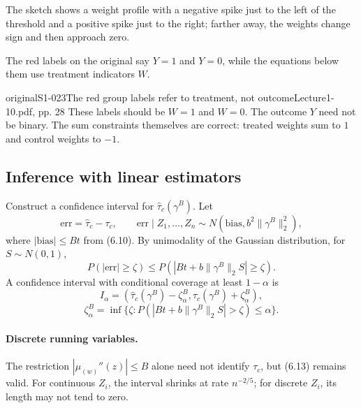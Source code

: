 The sketch shows a weight profile with a negative spike just to the left of the threshold and a positive spike just to the right; farther away, the weights change sign and then approach zero.
\begin{center}\end{center}
 The red labels on the original say $Y=1$ and $Y=0$, while the equations below them use treatment indicators $W$.
\begin{reviewnote}{original}{S1-023}{The red group labels refer to treatment, not outcome}{Lecture1-10.pdf, pp. 28}
These labels should be $W=1$ and $W=0$. The outcome $Y$ need not be binary. The sum constraints themselves are correct: treated weights sum to $1$ and control weights to $-1$.
\end{reviewnote}

\subsection{Inference with linear estimators}
Construct a confidence interval for $\widehat\tau_c(\gamma^B)$. Let
\[
\mathrm{err}=\widehat\tau_c-\tau_c,\qquad
\mathrm{err}\mid Z_1,\ldots,Z_n\sim N(\mathrm{bias},b^2\|\gamma^B\|_2^2),
\]
where $|\mathrm{bias}|\leq Bt$ from (6.10). By unimodality of the Gaussian distribution, for $S\sim N(0,1)$,
\[
P(|\mathrm{err}|\geq\zeta)\leq P(|Bt+b\|\gamma^B\|_2S|\geq\zeta).
\]
A confidence interval with conditional coverage at least $1-\alpha$ is
\[
I_\alpha=(\widehat\tau_c(\gamma^B)-\zeta_\alpha^B,
\widehat\tau_c(\gamma^B)+\zeta_\alpha^B),
\]
\[
\zeta_\alpha^B=\inf\{\zeta:P(|Bt+b\|\gamma^B\|_2S|>\zeta)\leq\alpha\}.
\tag{6.13 in the notes}
\]
\paragraph{Discrete running variables.}
The restriction $|\mu_{(w)}''(z)|\leq B$ alone need not identify $\tau_c$, but (6.13) remains valid. For continuous $Z_i$, the interval shrinks at rate $n^{-2/5}$; for discrete $Z_i$, its length may not tend to zero. 
